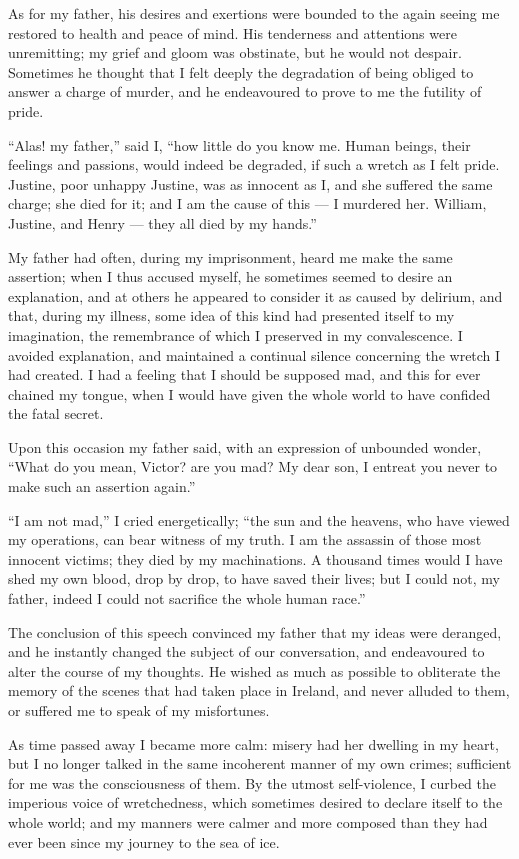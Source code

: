 As for my father, his desires and exertions
were bounded to the again seeing
me restored to health and peace of
mind. His tenderness and attentions
were unremitting; my grief and gloom
was obstinate, but he would not despair.
Sometimes he thought that I felt deeply
the degradation of being obliged to
answer a charge of murder, and he endeavoured
to prove to me the futility of
pride.

``Alas! my father,'' said I, ``how
little do you know me. Human beings,
their feelings and passions, would indeed
be degraded, if such a wretch as
I felt pride. Justine, poor unhappy
Justine, was as innocent as I, and she
suffered the same charge; she died
for it; and I am the cause of this --- I
murdered her. William, Justine,
and Henry --- they all died by my
hands.''

My father had often, during my imprisonment,
heard me make the same
assertion; when I thus accused myself,
he sometimes seemed to desire an explanation,
and at others he appeared to
consider it as caused by delirium, and
that, during my illness, some idea of
this kind had presented itself to my
imagination, the remembrance of which
I preserved in my convalescence. I
avoided explanation, and maintained
a continual silence concerning the
wretch I had created. I had a feeling
that I should be supposed mad, and this
for ever chained my tongue, when I
would have given the whole world to
have confided the fatal secret.

Upon this occasion my father said,
with an expression of unbounded
wonder, ``What do you mean, Victor?
are you mad? My dear son, I entreat
you never to make such an assertion
again.''

``I am not mad,'' I cried energetically;
``the sun and the heavens, who
have viewed my operations, can bear
witness of my truth. I am the assassin
of those most innocent victims; they
died by my machinations. A thousand
times would I have shed my own blood,
drop by drop, to have saved their lives;
but I could not, my father, indeed I
could not sacrifice the whole human
race.''

The conclusion of this speech convinced
my father that my ideas were
deranged, and he instantly changed the
subject of our conversation, and endeavoured
to alter the course of my
thoughts. He wished as much as possible
to obliterate the memory of the
scenes that had taken place in Ireland,
and never alluded to them, or suffered
me to speak of my misfortunes.

As time passed away I became more
calm: misery had her dwelling in my
heart, but I no longer talked in the
same incoherent manner of my own
crimes; sufficient for me was the consciousness
of them. By the utmost
self-violence, I curbed the imperious
voice of wretchedness, which sometimes
desired to declare itself to the whole
world; and my manners were calmer
and more composed than they had ever
been since my journey to the sea of
ice.

